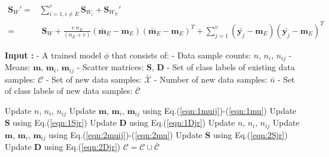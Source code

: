 \vspace{-0.3cm}
\begin{equation}
\label{eqn:1Sw}
\begin{split}
\textbf{S}_W' = & \sum_{i=1,i \neq E}^{c} {\textbf{S}_{W_i}} + {\textbf{S}_{W_E}'} \\
= & \; \textbf{S}_W + \frac{v \; n_E}{(n_E+v)} \left ( \bar{\textbf{m}}_E - \textbf{m}_E \right ) \left ( \bar{\textbf{m}}_E - \textbf{m}_E \right )^T + \sum_{j=1}^{v} \left ( \bar{\textbf{y}_{j}} - \textbf{m}_E \right ) \left ( \bar{\textbf{y}_{j}} - \textbf{m}_E \right )^T
\end{split}
\end{equation}

\clearpage


\begin{algorithm}[t]
\centering
\caption{MvIDA algorithm}
\label{MvIDA_Algo}
    \begin{algorithmic}
	\STATE \textbf{Input :}
	\STATE - A trained model $\phi$ that consists of:
	\STATE 		\hspace{0.3cm} - Data sample counts: $n$, $n_i$, $n_{ij}$
	\STATE 		\hspace{0.3cm} - Means: $\textbf{m}$, $\textbf{m}_i$, $\textbf{m}_{ij}$
	\STATE 		\hspace{0.3cm} - Scatter matrices: $\textbf{S}$, $\textbf{D}$
	\STATE 		\hspace{0.3cm} - Set of class labels of existing data samples: $\mathcal{C}$
	\STATE 		- Set of new data samples: $\bar{\mathcal{X}}$
	\STATE 		- Number of new data samples: $\bar{n}$
	\STATE 		- Set of class labels of new data samples: $\bar{\mathcal{C}}$ \vspace{0.1cm}

		
				\STATE \small Update $n$, $n_i$, $n_{ij}$\;
				\STATE \small Update $\textbf{m}$, $\textbf{m}_i$, $\textbf{m}_{ij}$ using Eq.(\ref{eqn:1muij})-(\ref{eqn:1mu})\;
				\STATE \small Update $\textbf{S}$ using Eq.(\ref{eqn:1Sjr})\;
				\STATE \small Update $\textbf{D}$ using Eq.(\ref{eqn:1Djr})\;
			\ELSE
				\STATE \small Update $n$, $n_i$, $n_{ij}$\;
				\STATE \small Update $\textbf{m}$, $\textbf{m}_i$, $\textbf{m}_{ij}$ using Eq.(\ref{eqn:2muij})-(\ref{eqn:2mu})\;
				\STATE \small Update $\textbf{S}$ using Eq.(\ref{eqn:2Sjr})\;
				\STATE \small Update $\textbf{D}$ using Eq.(\ref{eqn:2Djr})\;
				\STATE $\mathcal{C} = \mathcal{C} \cup \bar{\mathcal{C}}$
			\ENDIF


\end{algorithmic}
\end{algorithm}
